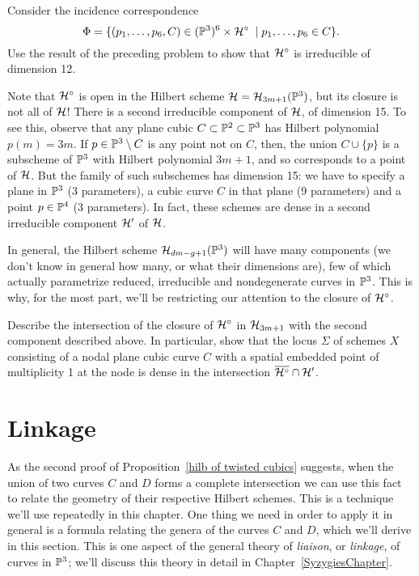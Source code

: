 \begin{exercise}
Consider the incidence correspondence
$$
\Phi = \{ (p_1,\dots,p_6, C) \in (\PP^3)^6 \times \cH^\circ \; \mid p_1,\dots,p_6 \in C  \}.
$$
Use the result of the preceding problem to show that $\cH^\circ$ is irreducible of dimension 12.
\end{exercise}


Note that $\cH^\circ$ is open in the Hilbert scheme $\cH = \cH_{3m+1}(\PP^3)$, but its closure is not all of $\cH$! There is a second irreducible component of $\cH$, of dimension 15. To see this, observe that any plane cubic $C \subset \PP^2 \subset \PP^3$ has Hilbert polynomial $p(m) = 3m$. If $p \in \PP^3 \setminus C$ is any point not on $C$, then, the union $C \cup \{p\}$ is a subscheme of $\PP^3$ with Hilbert polynomial $3m+1$, and so corresponds to a point of $\cH$. But the family of such subschemes has dimension 15: we have to specify a plane in $\PP^3$ (3 parameters), a cubic curve $C$ in that plane (9 parameters) and a point $p \in \PP^4$ (3 parameters). In fact, these schemes are dense in a second irreducible component $\cH'$ of $\cH$.

In general, the Hilbert scheme $\cH_{dm-g+1}(\PP^3)$ will have many components (we don't know in general how many, or what their dimensions are), few of which actually parametrize reduced, irreducible and nondegenerate curves in $\PP^3$. This is why, for the most part, we'll be restricting our attention to the closure of $\cH^\circ$. 

\begin{exercise}
Describe the intersection of the closure  of $\cH^\circ$ in $\cH_{3m+1}$ with the second component described above. In particular, show that the locus $\Sigma$ of schemes $X$ consisting of a nodal plane cubic curve $C$ with a spatial embedded point of multiplicity 1 at the node is dense in the intersection $\overline{\cH^\circ} \cap \cH'$.
\end{exercise}

\section{Linkage} \label{SLinkage}

As the second proof of Proposition~\ref{hilb of twisted cubics} suggests, when the union of two curves $C$ and $D$ forms a complete intersection we can use this fact to relate the geometry of their respective Hilbert schemes. This is a technique we'll use repeatedly in this chapter. One thing we need in order to apply it in general is a formula relating the genera of the curves $C$ and $D$, which we'll derive in this section. This is one aspect of the general theory of \emph{liaison}, or \emph{linkage}, of curves in $\PP^3$; we'll discuss this theory in detail in Chapter~\ref{SyzygiesChapter}.

